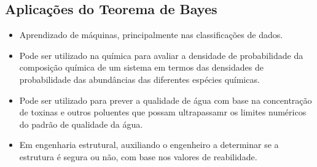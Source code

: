 \subsection{Aplicações do Teorema de Bayes}

\begin{itemize}
\item Aprendizado de máquinas, principalmente nas classificações de dados.
\item Pode ser utilizado na química para avaliar a densidade de probabilidade da composição química de um sistema em termos das densidades de probabilidade das abundâncias das diferentes espécies químicas.
\item Pode ser utilizado para prever a qualidade de água com base na concentração de toxinas e outros poluentes que possam ultrapassamr os limites numéricos do padrão de qualidade da água.
\item Em engenharia estrutural, auxiliando o engenheiro a determinar se a estrutura é segura ou não, com base nos valores de reabilidade. 
\end{itemize}



